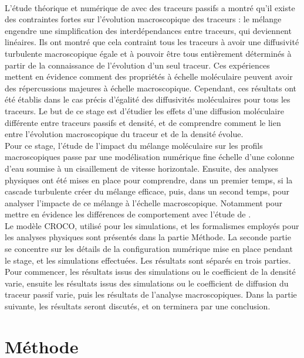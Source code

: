 \documentclass[a4paper,12pt]{article}
\begin{document}
    \\
    L'étude théorique et numérique de \cite{penney_diapycnal_2020} avec des traceurs passifs a montré qu’il existe des contraintes fortes sur l’évolution macroscopique des traceurs : le mélange engendre une simplification des interdépendances entre traceurs, qui deviennent linéaires. Ils ont montré que cela contraint tous les traceurs à avoir une diffusivité turbulente macroscopique égale et à pouvoir être tous entièrement déterminés à partir de la connaissance de l'évolution d’un seul traceur. Ces expériences mettent en évidence comment des propriétés à échelle moléculaire peuvent avoir des répercussions majeures à échelle macroscopique. Cependant, ces résultats ont été établis dans le cas précis d’égalité des diffusivités moléculaires pour tous les traceurs. Le but de ce stage est d'étudier les effets d’une diffusion moléculaire différente entre traceurs passifs et densité, et de comprendre comment le lien entre l'évolution macroscopique du traceur et de la densité évolue.  
    \\
    Pour ce stage, l'étude de l'impact du mélange moléculaire sur les profils macroscopiques passe par une modélisation numérique fine échelle d'une colonne d'eau soumise à un cisaillement de vitesse horizontale. Ensuite, des analyses physiques ont été mises en place pour comprendre, dans un premier temps, si la cascade turbulente créer du mélange efficace, puis, dans un second temps, pour analyser l'impacte de ce mélange à l'échelle macroscopique. Notamment pour mettre en évidence les différences de comportement avec l'étude de \cite{penney_diapycnal_2020}.
    \\
    Le modèle CROCO, utilisé pour les simulations, et les formalismes employés pour les analyses physiques sont présentés dans la partie Méthode. La seconde partie se concentre sur les détails de la configuration numérique mise en place pendant le stage, et les simulations effectuées. Les résultats sont séparés en trois parties. Pour commencer, les résultats issus des simulations ou le coefficient de la densité varie, ensuite les résultats issus des simulations ou le coefficient de diffusion du traceur passif varie, puis les résultats de l'analyse macroscopiques. Dans la partie suivante, les résultats seront discutés, et on terminera par une conclusion.

\newpage
\section{Méthode}
\end{document}
